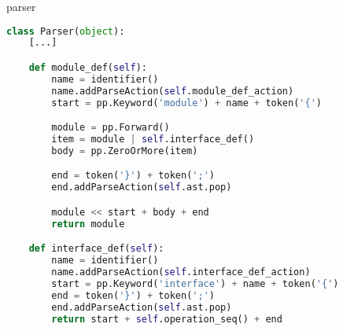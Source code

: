 \documentclass[11pt]{beamer}
\begin{document}
\begin{frame}[fragile]{parser}
\begin{lstlisting}[language=Python]
class Parser(object):
    [...]

    def module_def(self):
        name = identifier()
        name.addParseAction(self.module_def_action)
        start = pp.Keyword('module') + name + token('{')

        module = pp.Forward()
        item = module | self.interface_def()
        body = pp.ZeroOrMore(item)

        end = token('}') + token(';')
        end.addParseAction(self.ast.pop)

        module << start + body + end
        return module

    def interface_def(self):
        name = identifier()
        name.addParseAction(self.interface_def_action)
        start = pp.Keyword('interface') + name + token('{')
        end = token('}') + token(';')
        end.addParseAction(self.ast.pop)
        return start + self.operation_seq() + end
\end{lstlisting}
\end{frame}
\end{document}
